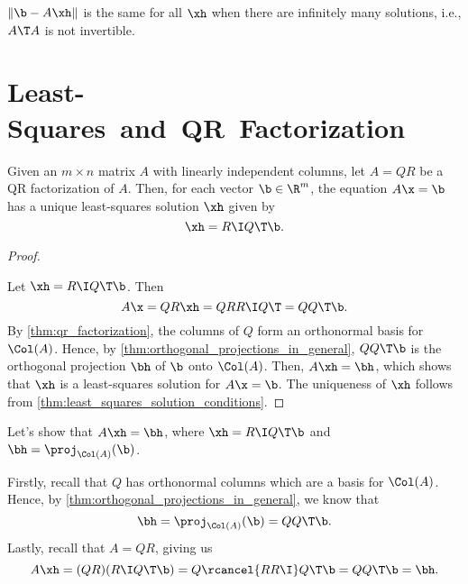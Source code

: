\begin{note}
  \label{nte:least_squares_solution_with_infinitely_many_solutions}

  $\lVert \b - A\xh \rVert$ is the same for all $\xh$ when there are infinitely
  many solutions, i.e., $A\T A$ is not invertible.
\end{note}


\section{Least-Squares~and~QR~Factorization}
\label{sec:least_squares_and_qr_factorization}


\begin{theorem}
  \label{thm:qr_factorization}

  Given an $m \times n$ matrix $A$ with linearly independent columns, let $A =
  QR$ be a QR factorization of $A$. Then, for each vector $\b \in \R^m$, the
  equation $A\x = \b$ has a unique least-squares solution $\xh$ given by
  \begin{equation}
    \label{eqt:thm_qr_factorization_1}
    \xh = R\I Q\T\b
  .\end{equation}
\end{theorem}

\begin{proof}
  \label{prf:qr_factorization}

  Let $\xh = R\I Q\T\b$. Then
  \[%
    A\x = QR\xh = QRR\I Q\T = QQ\T\b
  .\]%
  By \cref{thm:qr_factorization}, the columns of $Q$ form an orthonormal basis
  for $\Col(A)$. Hence, by \cref{thm:orthogonal_projections_in_general},
  $QQ\T\b$ is the orthogonal projection $\bh$ of $\b$ onto $\Col(A)$. Then,
  $A\xh = \bh$, which shows that $\xh$ is a least-squares solution for $A\x =
  \b$. The uniqueness of $\xh$ follows from
  \cref{thm:least_squares_solution_conditions}.
\end{proof}

Let's show that $A\xh = \bh$, where $\xh = R\I Q\T\b$ and $\bh =
\proj_{\Col(A)}(\b)$.

Firstly, recall that $Q$ has orthonormal columns which are a basis for
$\Col(A)$. Hence, by \cref{thm:orthogonal_projections_in_general}, we know that
\[%
  \bh = \proj_{\Col(A)}(\b) = QQ\T\b
.\]%
Lastly, recall that $A = QR$, giving us
\[%
  A\xh = (QR)(R\I Q\T\b) = Q\rcancel{RR\I}Q\T\b = QQ\T\b = \bh
.\]%

